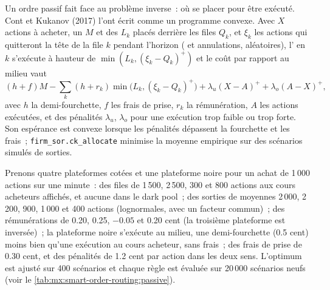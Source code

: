 Un ordre passif fait face au problème inverse~: où se placer pour être exécuté. Cont et Kukanov (2017) l'ont écrit comme un programme convexe. Avec $X$ actions
à acheter, un  $M$ et des  $L_k$ placés derrière les files $Q_k$, et $\xi_k$ les actions qui quitteront la tête de la file $k$ pendant
l'horizon ( et annulations, aléatoires), l' en $k$ s'exécute à hauteur de $\min(L_k,(\xi_k-Q_k)^+)$ et le coût par rapport au milieu vaut
\[
(h+f)M-\sum_k(h+r_k)\min\bigl(L_k,(\xi_k-Q_k)^+\bigr)+\lambda_u(X-A)^++\lambda_o(A-X)^+,
\]
avec $h$ la demi-fourchette, $f$ les frais de prise, $r_k$ la rémunération, $A$ les actions exécutées, et des pénalités $\lambda_u$, $\lambda_o$ pour une exécution trop faible ou
trop forte. Son espérance est convexe lorsque les pénalités dépassent la fourchette et les frais~; \texttt{firm\_sor.ck\_allocate} minimise la moyenne empirique
sur des scénarios simulés de sorties.

\label{lst:mx:smart-order-routing:ck}

Prenons quatre plateformes cotées et une plateforme noire pour un achat de 1\,000 actions sur une minute~: des files de 1\,500, 2\,500, 300 et 800 actions aux cours acheteurs affichés, et aucune dans le
dark pool~; des sorties de moyennes 2\,000, 2\,200, 900, 1\,000 et 400 actions (lognormales, avec un facteur commun)~; des rémunérations de 0.20, 0.25, $-0.05$ et 0.20
cent (la troisième plateforme est inversée)~; la plateforme noire s'exécute au milieu, une demi-fourchette (0.5 cent) moins bien qu'une exécution au cours acheteur, sans frais~; des frais de prise de
0.30 cent, et des pénalités de 1.2 cent par action dans les deux sens. L'optimum est ajusté sur 400 scénarios et chaque règle est évaluée sur 20\,000 scénarios neufs
(voir le \cref{tab:mx:smart-order-routing:passive}).

